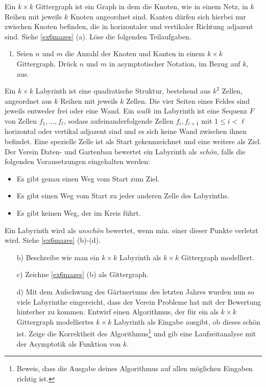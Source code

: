 \documentclass{uebung_cs}
\begin{document}
\begin{aufgabe}
	Ein $k\times k$ Gittergraph ist ein Graph in dem die Knoten, wie in einem Netz, in $k$ Reihen mit jeweils $k$ Knoten angeordnet sind.
	Kanten dürfen sich hierbei nur zwischen Knoten befinden, die in horizontaler und vertikaler Richtung adjazent sind.
	Siehe \ref{ex6mazes} (a).
	Löse die folgenden Teilaufgaben.
	\begin{enumerate}
		\item Seien $n$ und $m$ die Anzahl der Knoten und Kanten in einem $k\times k$ Gittergraph.
		Drück $n$ und $m$ in asymptotischer Notation, im Bezug auf $k$, aus.
	\end{enumerate}
	Ein $k\times k$ Labyrinth ist eine quadratische Struktur, bestehend aus $k^2$ Zellen, angeordnet aus $k$ Reihen mit jeweils $k$ Zellen.
	Die vier Seiten eines Feldes sind jeweils entweder frei oder eine Wand.
	Ein $walk$ im Labyrinth ist eine Sequenz $F$ von Zellen $f_1,..., f_\ell$, sodass aufeinanderfolgende Zellen $f_i, f_{i+1}$ mit $1 \leq i < \ell$ horizontal oder vertikal adjazent sind und es sich keine Wand zwischen ihnen befindet.
	Eine spezielle Zelle ist als Start gekennzeichnet und eine weitere als Ziel.\\
	Der Verein \glqq Daten- und Gartenbau\grqq{} bewertet ein Labyrinth als \textit{schön}, falls die folgenden Vorausetzungen eingehalten werden:
	\begin{itemize}
		\item Es gibt genau einen Weg vom Start zum Ziel.
		\item Es gibt einen Weg vom Start zu jeder anderen Zelle des Labyrinths.
		\item Es gibt keinen Weg, der im Kreis führt.
	\end{itemize}
	Ein Labyrinth wird als \textit{unschön} bewertet, wenn min. einer dieser Punkte verletzt wird.
	Siehe \ref{ex6mazes} (b)-(d).
	\begin{enumerate}
		\item[b)] Beschreibe wie man ein $k\times k$ Labyrinth als $k\times k$ Gittergraph modelliert.
		\item[c)] Zeichne \ref{ex6mazes} (b) als Gittergraph.
		\item[d)] Mit dem Aufschwung des Gärtnertums des letzten Jahres wurden nun so viele Labyrinthe eingereicht, dass der Verein Probleme hat mit der Bewertung hinterher zu kommen.
		Entwirf einen Algorithmus, der für ein als $k\times k$ Gittergraph modelliertes $k\times k$ Labyrinth als Eingabe ausgibt, ob dieses schön ist.
		Zeige die Korrektheit des Algorithmus\footnote{Beweis, dass die Ausgabe deines Algorithmus auf allen möglichen Eingaben richtig ist.} und gib eine Laufzeitanalyse mit der Asymptotik als Funktion von $k$.
	\end{enumerate}
\end{aufgabe}
\end{document}
